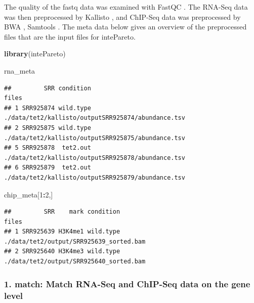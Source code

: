\documentclass[10pt,]{article}
\newenvironment{Shaded}{\begin{snugshade}}{\end{snugshade}}
\newcommand{\DecValTok}[1]{\textcolor[rgb]{0.00,0.00,0.81}{#1}}
\newcommand{\KeywordTok}[1]{\textcolor[rgb]{0.13,0.29,0.53}{\textbf{#1}}}
\newcommand{\NormalTok}[1]{#1}
\newcommand{\OperatorTok}[1]{\textcolor[rgb]{0.81,0.36,0.00}{\textbf{#1}}}
\begin{document}
The quality of the fastq data was examined with FastQC \autocite{andrews2010fastqc}. The RNA-Seq data was then preprocessed by Kallisto \autocite{bray2016},
and ChIP-Seq data was preprocessed by BWA \autocite{li2009a}, Samtools
\autocite{li2009}. The meta data below gives an overview of the
preprocessed files that are the input files for intePareto.

\begin{Shaded}
\begin{Highlighting}[]
\KeywordTok{library}\NormalTok{(intePareto)}
\end{Highlighting}
\end{Shaded}

\begin{Shaded}
\begin{Highlighting}[]
\NormalTok{rna_meta}
\end{Highlighting}
\end{Shaded}

\begin{verbatim}
##         SRR condition                                              files
## 1 SRR925874 wild.type ./data/tet2/kallisto/outputSRR925874/abundance.tsv
## 2 SRR925875 wild.type ./data/tet2/kallisto/outputSRR925875/abundance.tsv
## 5 SRR925878  tet2.out ./data/tet2/kallisto/outputSRR925878/abundance.tsv
## 6 SRR925879  tet2.out ./data/tet2/kallisto/outputSRR925879/abundance.tsv
\end{verbatim}

\begin{Shaded}
\begin{Highlighting}[]
\NormalTok{chip_meta[}\DecValTok{1}\OperatorTok{:}\DecValTok{2}\NormalTok{,]}
\end{Highlighting}
\end{Shaded}

\begin{verbatim}
##         SRR    mark condition                                   files
## 1 SRR925639 H3K4me1 wild.type ./data/tet2/output/SRR925639_sorted.bam
## 2 SRR925640 H3K4me3 wild.type ./data/tet2/output/SRR925640_sorted.bam
\end{verbatim}

\hypertarget{match-match-rna-seq-and-chip-seq-data-on-the-gene-level}{%
\subsubsection{\texorpdfstring{1. \textbf{match}: Match RNA-Seq and
ChIP-Seq data on the gene
level}{1. match: Match RNA-Seq and ChIP-Seq data on the gene level}}\label{match-match-rna-seq-and-chip-seq-data-on-the-gene-level}}
\end{document}

